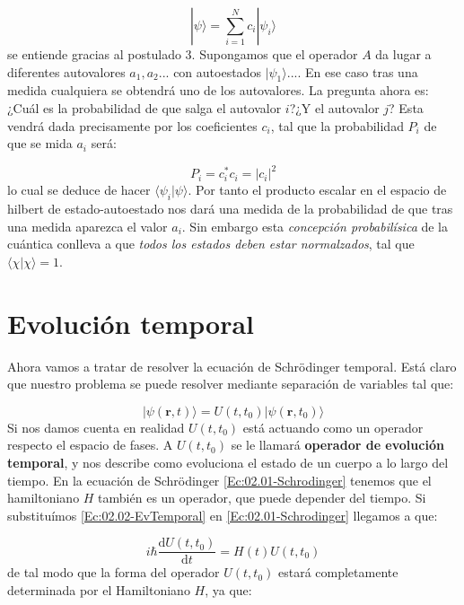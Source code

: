 \documentclass[12pt]{book}
\numberwithin{equation}{chapter}
\numberwithin{figure}{chapter}
\newcommand{\D}{\mathrm{d}}
\newcommand{\derivadas}[2]{\frac{\D #1}{\D #2}}
\newcommand{\rn}{\mathbf{r}}
\begin{document}
\begin{equation}
|\psi \rangle =  \sum_{i=1}^N c_i |\psi_i \rangle
\end{equation}
se entiende gracias al postulado 3. Supongamos que el operador $A$ da lugar a diferentes autovalores $a_1,a_2...$ con autoestados $|\psi_1 \rangle...$. En ese caso tras una medida cualquiera se obtendrá uno de los autovalores. La pregunta ahora es: ¿Cuál es la probabilidad de que salga el autovalor $i$?¿Y el autovalor $j$? Esta vendrá dada precisamente por los coeficientes $c_i$, tal que la probabilidad $P_i$ de que se mida $a_i$ será:

\begin{equation}
P_i = c_i ^* c_i = |c_i|^2
\end{equation}
lo cual se deduce de hacer $\langle \psi_i | \psi \rangle$. Por tanto el producto escalar en el espacio de hilbert de estado-autoestado nos dará una medida de la probabilidad de que tras una medida aparezca el valor $a_i$. Sin embargo esta \textit{concepción probabilísica} de la cuántica conlleva a que \textit{todos los estados deben estar normalzados}, tal que $\langle \chi | \chi \rangle = 1$. 


\section{Evolución temporal}
Ahora vamos a tratar de resolver la ecuación de Schrödinger temporal. Está claro que nuestro problema se puede resolver mediante separación de variables tal que:

\begin{equation}
| \psi (\rn,t) \rangle = U(t,t_0) |\psi (\rn,t_0) \rangle \label{Ec:02.02-EvTemporal}
\end{equation}
Si nos damos cuenta en realidad $U(t,t_0)$ está actuando como un operador respecto el espacio de fases. A $U(t,t_0)$ se le llamará \textbf{operador de evolución temporal}, y nos describe como evoluciona el estado de un cuerpo a lo largo del tiempo. En la ecuación de Schrödinger \ref{Ec:02.01-Schrodinger} tenemos que el hamiltoniano $H$ también es un operador, que puede depender del tiempo. Si substituímos \ref{Ec:02.02-EvTemporal} en \ref{Ec:02.01-Schrodinger} llegamos a que:

\begin{equation}
i \hbar \derivadas{U(t,t_0)}{t} = H(t) U(t,t_0)
\end{equation}
de tal modo que la forma del operador $U(t,t_0)$ estará completamente determinada por el Hamiltoniano $H$, ya que:
\end{document}
